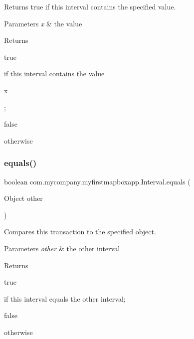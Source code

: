 Returns true if this interval contains the specified value.


\begin{DoxyParams}{Parameters}
{\em x} & the value \\
\hline
\end{DoxyParams}
\begin{DoxyReturn}{Returns}

\begin{DoxyCode}
\textcolor{keyword}{true} 
\end{DoxyCode}
 if this interval contains the value
\begin{DoxyCode}
x 
\end{DoxyCode}
 ; 
\begin{DoxyCode}
\textcolor{keyword}{false} 
\end{DoxyCode}
 otherwise 
\end{DoxyReturn}
\mbox{\label{classcom_1_1mycompany_1_1myfirstmapboxapp_1_1_interval_a72bd85dfc2178a46e7822bf4396551d0}} 
\subsubsection{\texorpdfstring{equals()}{equals()}}
{\footnotesize\ttfamily boolean com.\+mycompany.\+myfirstmapboxapp.\+Interval.\+equals (\begin{DoxyParamCaption}\item[{Object}]{other }\end{DoxyParamCaption})\hspace{0.3cm}{\ttfamily [inline]}}

Compares this transaction to the specified object.


\begin{DoxyParams}{Parameters}
{\em other} & the other interval \\
\hline
\end{DoxyParams}
\begin{DoxyReturn}{Returns}

\begin{DoxyCode}
\textcolor{keyword}{true} 
\end{DoxyCode}
 if this interval equals the other interval; 
\begin{DoxyCode}
\textcolor{keyword}{false} 
\end{DoxyCode}
 otherwise 
\end{DoxyReturn}
\mbox{\label{classcom_1_1mycompany_1_1myfirstmapboxapp_1_1_interval_a647f94b4cea335e3a5745b3ba123f71b}} 
